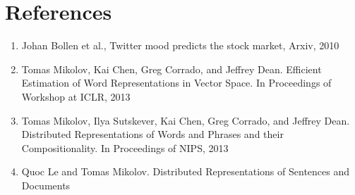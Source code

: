 \documentclass{sig-alternate-05-2015}
\begin{document}
\section{References}
\begin{enumerate}
	\item Johan Bollen et al., Twitter mood predicts the stock market, Arxiv, 2010
	\item Tomas Mikolov, Kai Chen, Greg Corrado, and Jeffrey Dean. Efficient Estimation of Word Representations in Vector Space. In Proceedings of Workshop at ICLR, 2013
	\item Tomas Mikolov, Ilya Sutskever, Kai Chen, Greg Corrado, and Jeffrey Dean. Distributed Representations of Words and Phrases and their Compositionality. In Proceedings of NIPS, 2013
	\item Quoc Le and Tomas Mikolov. Distributed Representations of Sentences and Documents
\end{enumerate}




	
	
	
\end{document}
